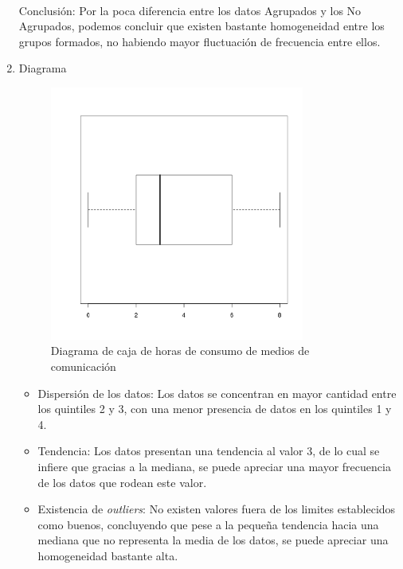 \documentclass[letterpaper,spanish,11pt]{article}
\begin{document}
\begin{enumerate}
			\\ Conclusi\'on: Por la poca diferencia entre los datos Agrupados y los No Agrupados, podemos concluir que
			 existen bastante homogeneidad entre los grupos formados, no habiendo mayor fluctuaci\'on de frecuencia entre ellos.
    \item Diagrama
	\begin{figure}[htbp]
	\centering
	\includegraphics[width=3.3in,height=3.3in]{caja1}
	\caption{Diagrama de caja de horas de consumo de medios de comunicaci\'on}
	\label{fig:caja1}
	\end{figure}
		\begin{itemize}
		 \item Dispersi\'on de los datos:
		Los datos se concentran en mayor cantidad entre los quintiles 2 y 3, con una menor presencia de datos en los quintiles 1 y 4.\\
		 \item Tendencia:
		Los datos presentan una tendencia al valor 3, de lo cual se infiere que gracias a la mediana, se puede apreciar una mayor frecuencia de los datos que rodean este valor.\\
		 \item Existencia de \textit{outliers}:
		No existen valores fuera de los limites establecidos como buenos, concluyendo que pese a la peque\~na tendencia hacia una mediana
		 que no representa la media de los datos, se puede apreciar una homogeneidad bastante alta.
		\end{itemize}


\end{enumerate}
\end{document}

